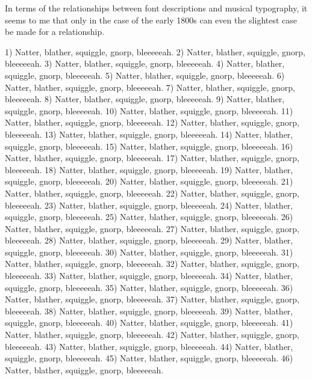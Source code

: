 \documentclass[10pt,letterpaper,busletter,dateno,addrfromright,addrfromleft,orderfromtodate,%
faxheaderpage]{newlfm}
\begin{document}
\begin{newlfm}
In terms of the relationships between font descriptions and musical
typography, it seems to me that only in the case of the early 1800s can even
the slightest case be made for a relationship.  


1) Natter, blather, squiggle, gnorp, bleeeeeah.
2) Natter, blather, squiggle, gnorp, bleeeeeah.
3) Natter, blather, squiggle, gnorp, bleeeeeah.
4) Natter, blather, squiggle, gnorp, bleeeeeah.
5) Natter, blather, squiggle, gnorp, bleeeeeah.
6) Natter, blather, squiggle, gnorp, bleeeeeah.
7) Natter, blather, squiggle, gnorp, bleeeeeah.
8) Natter, blather, squiggle, gnorp, bleeeeeah.
9) Natter, blather, squiggle, gnorp, bleeeeeah.
10) Natter, blather, squiggle, gnorp, bleeeeeah.
11) Natter, blather, squiggle, gnorp, bleeeeeah.
12) Natter, blather, squiggle, gnorp, bleeeeeah.
13) Natter, blather, squiggle, gnorp, bleeeeeah.
14) Natter, blather, squiggle, gnorp, bleeeeeah.
15) Natter, blather, squiggle, gnorp, bleeeeeah.
16) Natter, blather, squiggle, gnorp, bleeeeeah.
17) Natter, blather, squiggle, gnorp, bleeeeeah.
18) Natter, blather, squiggle, gnorp, bleeeeeah.
19) Natter, blather, squiggle, gnorp, bleeeeeah.
20) Natter, blather, squiggle, gnorp, bleeeeeah.
21) Natter, blather, squiggle, gnorp, bleeeeeah.
22) Natter, blather, squiggle, gnorp, bleeeeeah.
23) Natter, blather, squiggle, gnorp, bleeeeeah.
24) Natter, blather, squiggle, gnorp, bleeeeeah.
25) Natter, blather, squiggle, gnorp, bleeeeeah.
26) Natter, blather, squiggle, gnorp, bleeeeeah.
27) Natter, blather, squiggle, gnorp, bleeeeeah.
28) Natter, blather, squiggle, gnorp, bleeeeeah.
29) Natter, blather, squiggle, gnorp, bleeeeeah.
30) Natter, blather, squiggle, gnorp, bleeeeeah.
31) Natter, blather, squiggle, gnorp, bleeeeeah.
32) Natter, blather, squiggle, gnorp, bleeeeeah.
33) Natter, blather, squiggle, gnorp, bleeeeeah.
34) Natter, blather, squiggle, gnorp, bleeeeeah.
35) Natter, blather, squiggle, gnorp, bleeeeeah.
36) Natter, blather, squiggle, gnorp, bleeeeeah.
37) Natter, blather, squiggle, gnorp, bleeeeeah.
38) Natter, blather, squiggle, gnorp, bleeeeeah.
39) Natter, blather, squiggle, gnorp, bleeeeeah.
40) Natter, blather, squiggle, gnorp, bleeeeeah.
41) Natter, blather, squiggle, gnorp, bleeeeeah.
42) Natter, blather, squiggle, gnorp, bleeeeeah.
43) Natter, blather, squiggle, gnorp, bleeeeeah.
44) Natter, blather, squiggle, gnorp, bleeeeeah.
45) Natter, blather, squiggle, gnorp, bleeeeeah.
46) Natter, blather, squiggle, gnorp, bleeeeeah.

\end{newlfm}
\end{document}
